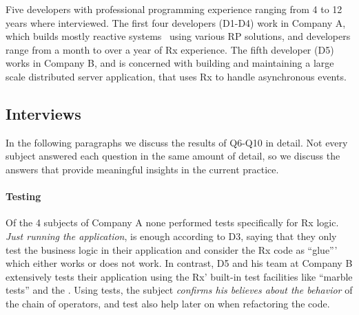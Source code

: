 Five developers with professional programming experience ranging from 4 to 12 years where interviewed.
The first four developers (D1-D4) work in Company A, which builds mostly reactive systems~\cite{boner2014reactive} using various RP solutions,
and developers range from a month to over a year of Rx experience. 
The fifth developer (D5) works in Company B, and is concerned with building and maintaining a large scale distributed server application, that uses Rx to handle asynchronous events.

\subsection{Interviews}
In the following paragraphs we discuss the results of Q6-Q10 in detail. Not every subject answered each question in the same amount of detail, so we discuss the answers that provide meaningful insights in the current practice.

\paragraph{Testing}
Of the 4 subjects of Company A none performed tests specifically for Rx logic. \emph{Just running the application}, is enough according to D3, saying that they only test the business logic in their application and consider the Rx code as ``glue''' which either works or does not work. In contrast, D5 and his team at Company B extensively tests their application using the Rx' built-in test facilities like ``marble tests'' and the . Using tests, the subject \emph{confirms his believes about the behavior} of the chain of operators, and test also help later on when refactoring the code.


